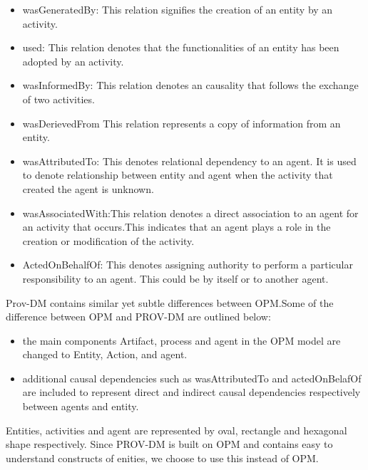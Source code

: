 \begin{itemize}
\item wasGeneratedBy: This relation signifies the creation of an entity by an activity. 

\item used: This relation denotes that the functionalities of an entity has been adopted by an activity.

\item wasInformedBy: This relation denotes an causality that follows the exchange of two activities.

\item wasDerievedFrom This relation represents a copy of information from an entity. 

\item wasAttributedTo: This denotes relational dependency to an agent. It is used to denote relationship between entity and agent when the activity that created the agent is unknown.

\item wasAssociatedWith:This relation denotes a direct association to an agent for an activity that occurs.This indicates that an agent plays a role in the creation or modification of the activity.

\item ActedOnBehalfOf: This denotes assigning authority to perform a particular responsibility to an agent. This could be by itself or to another agent.



\end{itemize}

Prov-DM contains similar yet subtle differences between OPM.Some of the difference between OPM and PROV-DM are outlined below:

\begin{itemize}

\item the main components Artifact, process and agent in the OPM model are changed to Entity, Action, and agent. 

\item additional causal dependencies such as wasAttributedTo and actedOnBelafOf are included to represent direct and indirect causal dependencies respectively between agents and entity.

\end{itemize}


Entities, activities and agent are represented by oval, rectangle and hexagonal shape respectively.
Since PROV-DM is built on OPM and contains easy to understand constructs of enities, we choose to use this instead of OPM. 


